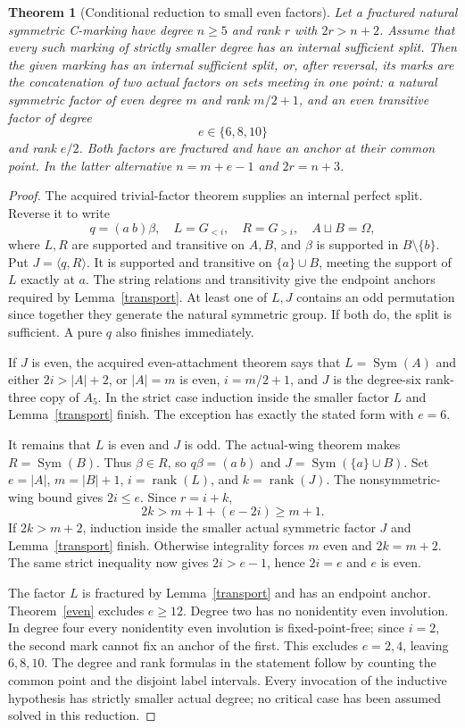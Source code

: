 \documentclass[11pt,a4paper]{article}
\newtheorem{theorem}[lemma]{Theorem}
\newcommand{\gen}[1]{\langle#1\rangle}
\newcommand{\Sym}{\operatorname{Sym}}
\begin{document}
\begin{theorem}[Conditional reduction to small even factors]\label{critical}
Let a fractured natural symmetric C-marking have degree $n\ge5$
and rank $r$ with $2r>n+2$. Assume that every such marking of
strictly smaller degree has an internal sufficient split.
Then the given marking has an internal sufficient split, or, after
reversal, its marks are the concatenation of two actual factors
on sets meeting in one point: a natural symmetric factor of even
degree $m$ and rank $m/2+1$, and an even transitive factor of degree
\[
                         e\in\{6,8,10\}
\]
and rank $e/2$. Both factors are fractured and have an anchor at
their common point. In the latter alternative $n=m+e-1$ and
$2r=n+3$.
\end{theorem}
\begin{proof}
The acquired trivial-factor theorem supplies an internal perfect
split. Reverse it to write
\[
 q=(a\ b)\beta,\quad L=G_{<i},\quad R=G_{>i},\quad
 A\sqcup B=\Omega,
\]
where $L,R$ are supported and transitive on $A,B$, and $\beta$
is supported in $B\setminus\{b\}$. Put $J=\gen{q,R}$.
It is supported and transitive on $\{a\}\cup B$, meeting the
support of $L$ exactly at $a$. The string relations and transitivity
give the endpoint anchors required by Lemma~\ref{transport}.
At least one of $L,J$ contains an odd permutation since together
they generate the natural symmetric group. If both do, the split
is sufficient. A pure $q$ also finishes immediately.

If $J$ is even, the acquired even-attachment theorem says that
$L=\Sym(A)$ and either $2i>|A|+2$, or $|A|=m$ is even,
$i=m/2+1$, and $J$ is the degree-six rank-three copy of $A_5$.
In the strict case induction inside the smaller factor $L$ and
Lemma~\ref{transport} finish. The exception has exactly the stated
form with $e=6$.

It remains that $L$ is even and $J$ is odd. The actual-wing theorem
makes $R=\Sym(B)$. Thus $\beta\in R$, so $q\beta=(a\ b)$
and $J=\Sym(\{a\}\cup B)$. Set $e=|A|$, $m=|B|+1$,
$i=\operatorname{rank}(L)$, and $k=\operatorname{rank}(J)$.
The nonsymmetric-wing bound gives $2i\le e$. Since $r=i+k$,
\[
                    2k>m+1+(e-2i)\ge m+1.
\]
If $2k>m+2$, induction inside the smaller actual symmetric factor
$J$ and Lemma~\ref{transport} finish. Otherwise integrality forces
$m$ even and $2k=m+2$. The same strict inequality now gives
$2i>e-1$, hence $2i=e$ and $e$ is even.

The factor $L$ is fractured by Lemma~\ref{transport} and has an
endpoint anchor. Theorem~\ref{even} excludes $e\ge12$.
Degree two has no nonidentity even involution. In degree four every
nonidentity even involution is fixed-point-free; since $i=2$,
the second mark cannot fix an anchor of the first. This excludes
$e=2,4$, leaving $6,8,10$. The degree and rank formulas in the
statement follow by counting the common point and the disjoint
label intervals. Every invocation of the inductive hypothesis has
strictly smaller actual degree; no critical case has been assumed
solved in this reduction.
\end{proof}
\end{document}
